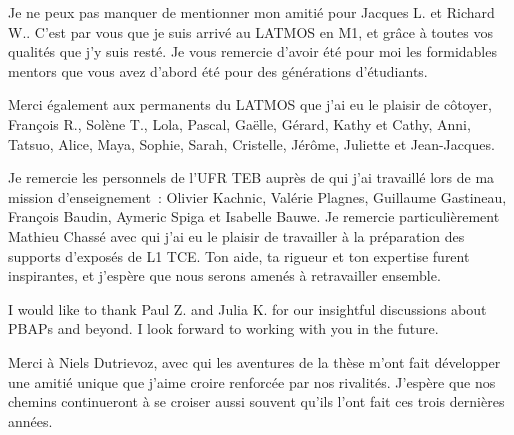 {%
Je ne peux pas manquer de mentionner mon amitié pour Jacques L. et Richard W.. C'est par vous que je suis arrivé au LATMOS en M1, et grâce à toutes vos qualités que j'y suis resté. Je vous remercie d'avoir été pour moi les formidables mentors que vous avez d'abord été pour des générations d'étudiants.

\noindent
Merci également aux permanents du LATMOS que j'ai eu le plaisir de côtoyer, François R., Solène T., Lola, Pascal, Gaëlle, Gérard, Kathy et Cathy, Anni, Tatsuo, Alice, Maya, Sophie, Sarah, Cristelle, Jérôme, Juliette et Jean-Jacques.
\vspace{1em}


%
Je remercie les personnels de l'UFR TEB auprès de qui j'ai travaillé lors de ma mission d'enseignement~: Olivier Kachnic, Valérie Plagnes, Guillaume Gastineau, François Baudin, Aymeric Spiga et Isabelle Bauwe.
Je remercie particulièrement Mathieu Chassé avec qui j'ai eu le plaisir de travailler à la préparation des supports d'exposés de L1 TCE. Ton aide, ta rigueur et ton expertise furent inspirantes, et j'espère que nous serons amenés à retravailler ensemble.
\vspace{1em}
%

I would like to thank Paul Z. and Julia K. for our insightful discussions about PBAPs and beyond. I look forward to working with you in the future.
\vspace{1em}
 


Merci à Niels Dutrievoz, avec qui les aventures de la thèse m'ont fait développer une amitié unique que j'aime croire renforcée par nos rivalités. J'espère que nos chemins continueront à se croiser aussi souvent qu'ils l'ont fait ces trois dernières années.

}
